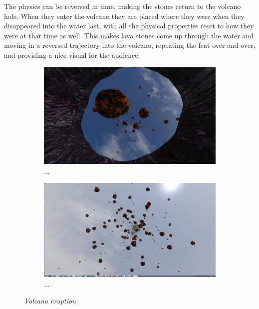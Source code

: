 The physics can be reversed in time, making the stones return to the volcano hole. When they enter the volcano they are placed where they were when they disappeared into the water last, with all the physical properties reset to how they were at that time as well. This makes lava stones come up through the water and moving in a reversed trajectory into the volcano, repeating the feat over and over, and providing a nice visual for the audience.

\begin{figure}[H]
\begin{subfigure}{\textwidth}
  \centering
  \includegraphics[width=0.9\linewidth]{images/Volcano1.jpg}
  \caption{...}
  \label{fig:vulcano1}
\end{subfigure}%

\begin{subfigure}{\textwidth}
  \centering
  \includegraphics[width=0.9\linewidth]{images/Volcano2.jpg}
  \caption{...}
  \label{fig:vulcano2}
\end{subfigure}
\caption[Noise comparison]{\textit{Volcano eruption.}}
\label{fig:vulcano3}
\end{figure}



